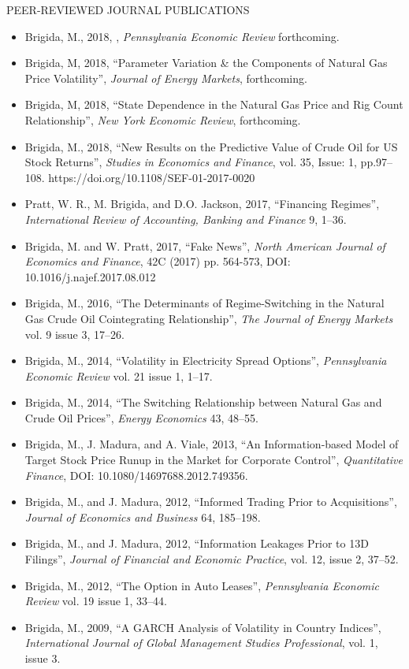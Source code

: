 \documentclass[9pt]{article}
\begin{document}
\vspace{10pt}
PEER-REVIEWED JOURNAL PUBLICATIONS
\begin{itemize}[noitemsep, nolistsep]
\item Brigida, M., 2018, \href{https://docs.google.com/file/d/0B46EsGCAlLnPWTctYmtnUDM1QWs/edit?usp=sharing}{\color{Blue}{``Causes of Asymmetric Volatility in Oil Futures''}}, {\it Pennsylvania Economic Review\/} forthcoming.
\item Brigida, M, 2018, ``Parameter Variation \& the Components of Natural Gas Price Volatility'', {\it Journal of Energy Markets}, forthcoming.
\item Brigida, M, 2018, ``State Dependence in the Natural Gas Price and Rig Count Relationship'', {\it New York Economic Review}, forthcoming.
\item Brigida, M., 2018, ``New Results on the Predictive Value of Crude Oil for US Stock Returns'', {\it Studies in Economics and Finance}, vol. 35, Issue: 1, pp.97--108. https://doi.org/10.1108/SEF-01-2017-0020
\item Pratt, W. R., M. Brigida, and D.O. Jackson, 2017, ``Financing Regimes'', {\it International Review of Accounting, Banking and Finance} 9, 1--36. \href{http://www.irabf.org/publication/Financing Regimes.pdf}{\color{Blue}{http://www.irabf.org/publication/Financing Regimes.pdf}}
\item Brigida, M. and W. Pratt, 2017, ``Fake News'', {\it North American Journal of Economics and Finance\/}, 42C (2017) pp. 564-573, DOI: 10.1016/j.najef.2017.08.012
\item Brigida, M., 2016, ``The Determinants of Regime-Switching in the Natural Gas Crude Oil Cointegrating Relationship'', {\it The Journal of Energy Markets} vol. 9 issue 3, 17--26.
\item Brigida, M., 2014, ``Volatility in Electricity Spread Options'', {\it Pennsylvania Economic Review} vol. 21 issue 1, 1--17.
\item Brigida, M., 2014, ``The Switching Relationship between Natural Gas and Crude Oil Prices'', {\it Energy Economics\/} 43, 48--55.  
\item Brigida, M., J. Madura, and A. Viale, 2013, ``An Information-based Model of Target Stock Price Runup in the Market for Corporate Control'', {\it Quantitative Finance\/}, DOI: 10.1080/14697688.2012.749356.
\item Brigida, M., and J. Madura, 2012, ``Informed Trading Prior to Acquisitions'', {\it Journal of Economics and Business} 64, 185--198.
\item Brigida, M., and J. Madura, 2012, ``Information Leakages Prior to 13D Filings'', {\it Journal of Financial and Economic Practice}, vol. 12, issue 2, 37--52.
\item Brigida, M., 2012, ``The Option in Auto Leases'', {\it Pennsylvania Economic Review} vol. 19 issue 1, 33--44.
\item Brigida, M., 2009, ``A GARCH Analysis of Volatility in Country Indices'', {\it International Journal of Global Management Studies Professional}, vol. 1, issue 3.
\end{itemize}
\end{document}
